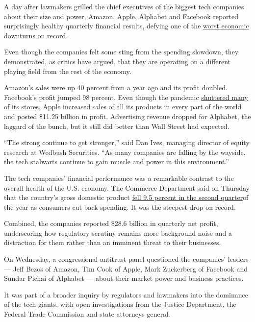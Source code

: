 A day after lawmakers grilled the chief executives of the biggest tech
companies about their size and power, Amazon, Apple, Alphabet and
Facebook reported surprisingly healthy quarterly financial results,
defying one of the
\href{https://www.nytimes3xbfgragh.onion/live/2020/07/30/business/stock-market-today-coronavirus/the-us-economys-contraction-in-the-second-quarter-was-the-worst-on-record}{worst
economic downturns on record}.

Even though the companies felt some sting from the spending slowdown,
they demonstrated, as critics have argued, that they are operating on a
different playing field from the rest of the economy.

Amazon's sales were up 40 percent from a year ago and its profit
doubled. Facebook's profit jumped 98 percent. Even though the pandemic
\href{https://www.nytimes3xbfgragh.onion/2020/03/14/technology/apple-stores-coronavirus.html}{shuttered
many of its store}s, Apple increased sales of all its products in every
part of the world and posted \$11.25 billion in profit. Advertising
revenue dropped for Alphabet, the laggard of the bunch, but it still did
better than Wall Street had expected.

``The strong continue to get stronger,'' said Dan Ives, managing
director of equity research at Wedbush Securities. ``As many companies
are falling by the wayside, the tech stalwarts continue to gain muscle
and power in this environment.''

The tech companies' financial performance was a remarkable contrast to
the overall health of the U.S. economy. The Commerce Department said on
Thursday that the country's gross domestic product
\href{https://www.nytimes3xbfgragh.onion/2020/07/30/business/economy/q2-gdp-coronavirus-economy.html?action=click\&module=Top\%20Stories\&pgtype=Homepage}{fell
9.5 percent in the second quarter}of the year as consumers cut back
spending. It was the steepest drop on record.

Combined, the companies reported \$28.6 billion in quarterly net profit,
underscoring how regulatory scrutiny remains more background noise and a
distraction for them rather than an imminent threat to their businesses.

On Wednesday, a congressional antitrust panel questioned the companies'
leaders --- Jeff Bezos of Amazon, Tim Cook of Apple, Mark Zuckerberg of
Facebook and Sundar Pichai of Alphabet --- about their market power and
business practices.

It was part of a broader inquiry by regulators and lawmakers into the
dominance of the tech giants, with open investigations from the Justice
Department, the Federal Trade Commission and state attorneys general.

